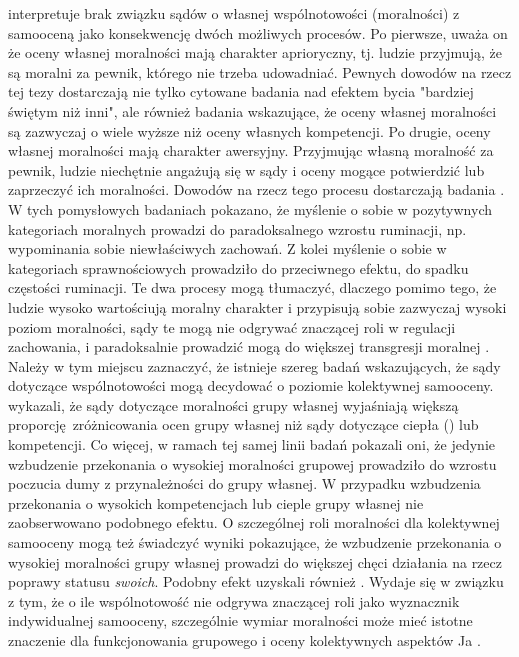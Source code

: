 \documentclass[man]{apa6}
\begin{document}
\textcite{wojciszke2010sprawczosc} interpretuje brak związku sądów o własnej wspólnotowości (moralności) z samooceną jako konsekwencję dwóch możliwych procesów. Po pierwsze, uważa on że oceny własnej moralności mają charakter aprioryczny, tj. ludzie przyjmują, że są moralni za pewnik, którego nie trzeba udowadniać. Pewnych dowodów na rzecz tej tezy dostarczają nie tylko cytowane badania nad efektem bycia "bardziej świętym niż inni", ale również badania \textcite{wojciszke2010sprawczosc} wskazujące, że oceny własnej moralności są zazwyczaj o wiele wyższe niż oceny własnych kompetencji. Po drugie, oceny własnej moralności mają charakter awersyjny. Przyjmując własną moralność za pewnik, ludzie niechętnie angażują się w sądy i oceny mogące potwierdzić lub zaprzeczyć ich moralności. Dowodów na rzecz tego procesu dostarczają badania \textcite{baryla2005wplyw}. W tych pomysłowych badaniach pokazano, że myślenie o sobie w pozytywnych kategoriach moralnych prowadzi do paradoksalnego wzrostu ruminacji, np. wypominania sobie niewłaściwych zachowań. Z kolei myślenie o sobie w kategoriach sprawnościowych prowadziło do przeciwnego efektu, do spadku częstości ruminacji. Te dwa procesy mogą tłumaczyć, dlaczego pomimo tego, że ludzie wysoko wartościują moralny charakter \parencite{gausel2011concern, goodwin2014moral} i przypisują sobie zazwyczaj wysoki poziom moralności, sądy te mogą nie odgrywać znaczącej roli w regulacji zachowania, i paradoksalnie prowadzić mogą do większej transgresji moralnej \parencite{merritt2010moral, monin2001moral, iyer2012sugaring}.\\

Należy w tym miejscu zaznaczyć, że istnieje szereg badań wskazujących, że sądy dotyczące wspólnotowości mogą decydować o poziomie kolektywnej samooceny. \textcite{leach2007group} wykazali, że sądy dotyczące moralności grupy własnej wyjaśniają większą proporcję zróżnicowania ocen grupy własnej niż sądy dotyczące ciepła () lub kompetencji. Co więcej, w ramach tej samej linii badań pokazali oni, że jedynie wzbudzenie przekonania o wysokiej moralności grupowej prowadziło do wzrostu poczucia dumy z przynależności do grupy własnej. W przypadku wzbudzenia przekonania o wysokich kompetencjach lub cieple grupy własnej nie zaobserwowano podobnego efektu. O szczególnej roli moralności dla kolektywnej samooceny mogą też świadczyć wyniki \textcite{ellemers2008better} pokazujące, że wzbudzenie przekonania o wysokiej moralności grupy własnej prowadzi do większej chęci działania na rzecz poprawy statusu \emph{swoich}. Podobny efekt uzyskali również \textcite{pagliaro2011sharing}. Wydaje się w związku z tym, że o ile wspólnotowość nie odgrywa znaczącej roli jako wyznacznik indywidualnej samooceny, szczególnie wymiar moralności może mieć istotne znaczenie dla funkcjonowania grupowego i oceny kolektywnych aspektów Ja \parencite[patrz również,][]{ellemers2012morality, leach2013groups}.
\end{document}
